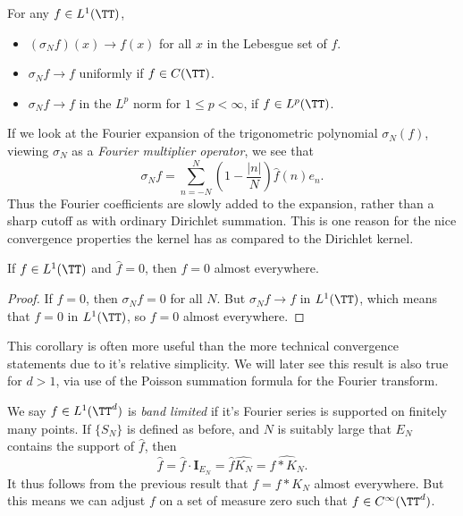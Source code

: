 \begin{theorem} For any $f \in L^1(\TT)$,
    \begin{itemize}
        \item $(\sigma_N f)(x) \to f(x)$ for all $x$ in the Lebesgue set of $f$.
        \item $\sigma_N f \to f$ uniformly if $f \in C(\TT)$.
        \item $\sigma_N f \to f$ in the $L^p$ norm for $1 \leq p < \infty$, if $f \in L^p(\TT)$.
    \end{itemize}

\end{theorem}

If we look at the Fourier expansion of the trigonometric polynomial $\sigma_N(f)$, viewing $\sigma_N$ as a \emph{Fourier multiplier operator}, we see that
%
\[ \sigma_N f = \sum_{n = -N}^N \left( 1 - \frac{|n|}{N} \right) \widehat{f}(n) e_n. \]
%
Thus the Fourier coefficients are slowly added to the expansion, rather than a sharp cutoff as with ordinary Dirichlet summation. This is one reason for the nice convergence properties the kernel has as compared to the Dirichlet kernel.

\begin{corollary}
    If $f \in L^1(\TT)$ and $\widehat{f} = 0$, then $f = 0$ almost everywhere.
\end{corollary}
\begin{proof}
    If $\widehat{f} = 0$, then $\sigma_N f = 0$ for all $N$. But $\sigma_N f \to f$ in $L^1(\TT)$, which means that $f = 0$ in $L^1(\TT)$, so $f = 0$ almost everywhere.
\end{proof}

This corollary is often more useful than the more technical convergence statements due to it's relative simplicity. We will later see this result is also true for $d > 1$, via use of the Poisson summation formula for the Fourier transform.

\begin{example}
    We say $f \in L^1(\TT^d)$ is \emph{band limited} if it's Fourier series is supported on finitely many points. If $\{ S_N \}$ is defined as before, and $N$ is suitably large that $E_N$ contains the support of $\widehat{f}$, then
    \[ \widehat{f} = \widehat{f} \cdot \mathbf{I}_{E_N} = \widehat{f} \widehat{K_N} = \widehat{f * K_N}. \]
    It thus follows from the previous result that $f = f * K_N$ almost everywhere. But this means we can adjust $f$ on a set of measure zero such that $f \in C^\infty(\TT^d)$.
\end{example}

